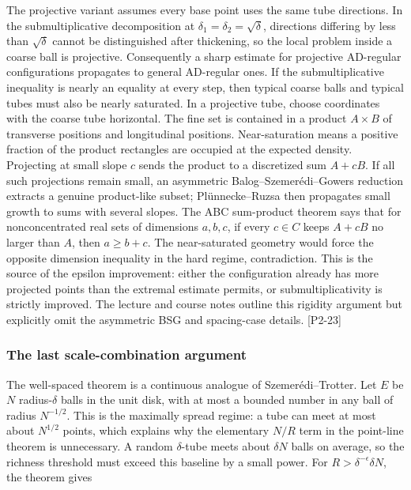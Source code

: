 The projective variant assumes every base point uses the same tube directions. In the submultiplicative decomposition at \(\delta_1=\delta_2=\sqrt\delta\), directions differing by less than \(\sqrt\delta\) cannot be distinguished after thickening, so the local problem inside a coarse ball is projective. Consequently a sharp estimate for projective AD-regular configurations propagates to general AD-regular ones. If the submultiplicative inequality is nearly an equality at every step, then typical coarse balls and typical tubes must also be nearly saturated. In a projective tube, choose coordinates with the coarse tube horizontal. The fine set is contained in a product \(A\times B\) of transverse positions and longitudinal positions. Near-saturation means a positive fraction of the product rectangles are occupied at the expected density. Projecting at small slope \(c\) sends the product to a discretized sum \(A+cB\). If all such projections remain small, an asymmetric Balog--Szemerédi--Gowers reduction extracts a genuine product-like subset; Plünnecke--Ruzsa then propagates small growth to sums with several slopes. The ABC sum-product theorem says that for nonconcentrated real sets of dimensions \(a,b,c\), if every \(c\in C\) keeps \(A+cB\) no larger than \(A\), then \(a\ge b+c\). The near-saturated geometry would force the opposite dimension inequality in the hard regime, contradiction. This is the source of the epsilon improvement: either the configuration already has more projected points than the extremal estimate permits, or submultiplicativity is strictly improved. The lecture and course notes outline this rigidity argument but explicitly omit the asymmetric BSG and spacing-case details. {[}P2-23{]}

\subsubsection{The last scale-combination argument}\label{04-visual-computing-ii-ch033-the-last-scale-combination-argument}

\hypertarget{04-visual-computing-ii-ch033-the-last-scale-combination-argument}{}

The well-spaced theorem is a continuous analogue of Szemerédi--Trotter. Let \(E\) be \(N\) radius-\(\delta\) balls in the unit disk, with at most a bounded number in any ball of radius \(N^{-1/2}\). This is the maximally spread regime: a tube can meet at most about \(N^{1/2}\) points, which explains why the elementary \(N/R\) term in the point-line theorem is unnecessary. A random \(\delta\)-tube meets about \(\delta N\) balls on average, so the richness threshold must exceed this baseline by a small power. For \(R>\delta^{-\epsilon}\delta N\), the theorem gives

